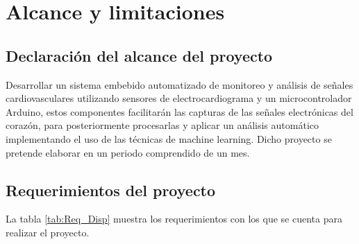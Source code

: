\section{Alcance y limitaciones}
\label{sec:scope}
\subsection{Declaración del alcance del proyecto}
Desarrollar un sistema embebido automatizado de monitoreo y análisis de señales cardiovasculares utilizando sensores de electrocardiograma y un microcontrolador Arduino, estos componentes facilitarán las capturas de las señales electrónicas del corazón, para posteriormente procesarlas y aplicar un análisis automático implementando el uso de las técnicas de machine learning. Dicho proyecto se pretende elaborar en un periodo comprendido de un mes.
\subsection{Requerimientos del proyecto}
La tabla \ref{tab:Req_Disp} muestra los requerimientos con los que se cuenta para realizar el proyecto.

